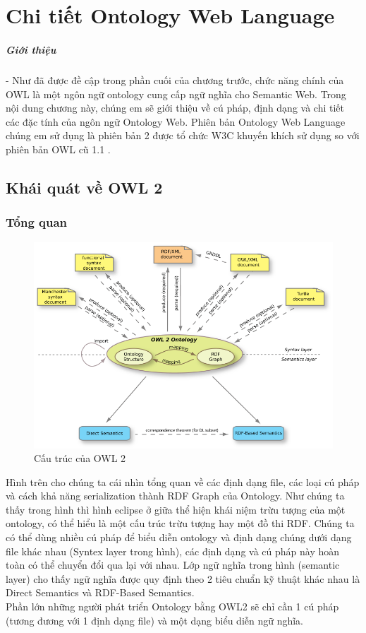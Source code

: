 \chapter{Chi tiết Ontology Web Language}
\paragraph{Giới thiệu } - Như đã được đề cập trong phần cuối của chương trước, chức năng chính của OWL là một ngôn ngữ ontology cung cấp ngữ nghĩa cho Semantic Web. Trong nội dung chương này, chúng em sẽ giới thiệu về cú pháp, định dạng và chi tiết các đặc tính của ngôn ngữ Ontology Web. Phiên bản Ontology Web Language chúng em sử dụng là phiên bản 2 được tổ chức W3C khuyến khích sử dụng so với phiên bản OWL cũ 1.1 .
\section{Khái quát về OWL 2 \cite{owl2}}
\subsection{Tổng quan}
\begin{figure}[ht!]
	\centering
	\includegraphics[width=120mm]{Figures/owl2structure.png}
	\caption{Cấu trúc của OWL 2\label{overflow}}
\end{figure}
Hình trên cho chúng ta cái nhìn tổng quan về các định dạng file, các loại cú pháp và cách khả năng serialization thành RDF Graph của Ontology. Như chúng ta thấy trong hình thì hình eclipse ở giữa thể hiện khái niệm trừu tượng của một ontology, có thể hiểu là một cấu trúc trừu tượng hay một đồ thi RDF. Chúng ta có thể dùng nhiều cú pháp để biểu diễn ontology và định dạng chúng dưới dạng file khác nhau (Syntex layer trong hình), các định dạng và cú pháp này hoàn toàn có thể chuyển đổi qua lại với nhau. Lớp ngữ nghĩa trong hình (semantic layer) cho thấy ngữ nghĩa được quy định theo 2 tiêu chuẩn kỹ thuật khác nhau là Direct Semantics và RDF-Based Semantics.
\\
Phần lớn những người phát triển Ontology bằng OWL2 sẽ chỉ cần 1 cú pháp (tương đương với 1 định dạng file) và một dạng biểu diễn ngữ nghĩa.
